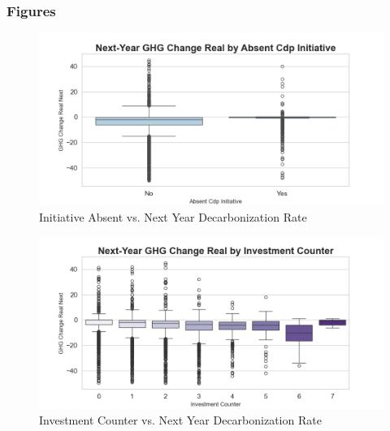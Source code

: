 

\subsubsection{Figures}

\begin{figure}[H]
\centering
  \includegraphics[width=\textwidth]{figures/ghg_change_real_next_by_absent_cdp_initiative.png}
\caption{Initiative Absent vs. Next Year Decarbonization Rate}
\label{fig:ghg_change_real_next_by_absent_cdp_initiative}
\end{figure}

\begin{figure}[H]
\centering
  \includegraphics[width=\textwidth]{figures/ghg_change_real_next_by_investment_counter.png}
\caption{Investment Counter vs. Next Year Decarbonization Rate}
\label{fig:ghg_change_real_next_by_investment_counter}
\end{figure}




